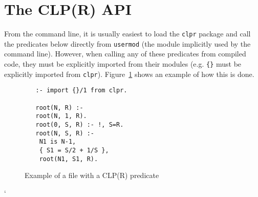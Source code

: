 \section{The CLP(R) API} \label{sec:clpr-api}
%
From the command line, it is usually easiest to load the {\tt clpr}
package and call the predicates below directly from {\tt usermod} (the
module implicitly used by the command line).  However, when calling
any of these predicates from compiled code, they must be explicitly
imported from their modules (e.g. {\tt \{\}} must be explicitly
imported from {\tt clpr}).  Figure~\ref{fig:clpr} shows an example of
how this is done.
%
\begin{figure} \label{fig:clpr}
{\small 
\begin{verbatim}
   :- import {}/1 from clpr.

   root(N, R) :-
   root(N, 1, R).
   root(0, S, R) :- !, S=R.
   root(N, S, R) :-
	N1 is N-1,
	{ S1 = S/2 + 1/S },
	root(N1, S1, R).
\end{verbatim}
}
\caption{Example of a file with a CLP(R) predicate}
\end{figure}
%
`
